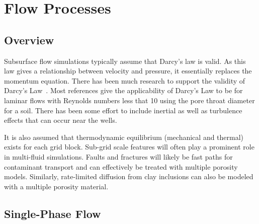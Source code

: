 %
%

\def\bnabla{{\boldsymbol{\nabla}}}
\def\bg{{\boldsymbol{g}}}
\def\bq{{\boldsymbol{q}}}
\def\K{{\mathbb K}}

\def\ucdot{{\,\cdot\,}}
\def\ukg{{\rm kg}}
\def\um{{\rm m}}
\def\us{{\rm s}}

\section{Flow Processes}         
\label{sec:flow}

\subsection{Overview}

Subsurface flow simulations typically assume that Darcy's law is
valid. As this law gives a relationship between velocity and pressure,
it essentially replaces the momentum equation. There has been much
research to support the validity of Darcy's
Law~\citep{bear-1972}.
Most references give the applicability of
Darcy's Law to be for laminar flows with Reynolds numbers less that 10 using the pore throat diameter for a soil.
There has been some effort to include inertial as well as turbulence effects that can occur near the wells.

It is also assumed that thermodynamic equilibrium (mechanical and
thermal) exists for each grid block.  Sub-grid scale features will
often play a prominent role in multi-fluid simulations. Faults and
fractures will likely be fast paths for contaminant transport and can
effectively be treated with multiple porosity models. Similarly,
rate-limited diffusion from clay inclusions can also be modeled with a
multiple porosity material.



\subsection{Single-Phase Flow}
\label{sec:single-phase-flow}

